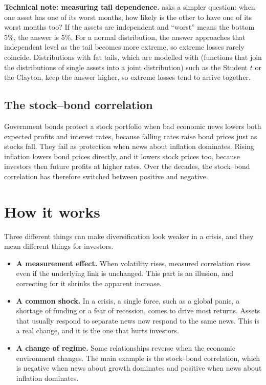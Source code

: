 \begin{technote}
\textbf{Technical note: measuring tail dependence.}  asks a simpler question: when one asset has one of its worst months, how likely is the other to have one of its worst months too? If the assets are independent and ``worst'' means the bottom 5\%, the answer is 5\%. For a normal distribution, the answer approaches that independent level as the tail becomes more extreme, so extreme losses rarely coincide. Distributions with fat tails, which are modelled with  (functions that join the distributions of single assets into a joint distribution) such as the Student $t$ or the Clayton, keep the answer higher, so extreme losses tend to arrive together.
\end{technote}

\subsection{The stock--bond correlation}

Government bonds protect a stock portfolio when bad economic news lowers both expected profits and interest rates, because falling rates raise bond prices just as stocks fall. They fail as protection when news about inflation dominates. Rising inflation lowers bond prices directly, and it lowers stock prices too, because investors then  future profits at higher rates. Over the decades, the stock--bond correlation has therefore switched between positive and negative.


\section{How it works}
\label{sec:13-how}

Three different things can make diversification look weaker in a crisis, and they mean different things for investors.

\begin{itemize}
  \item \textbf{A measurement effect.} When volatility rises, measured correlation rises even if the underlying link is unchanged. This part is an illusion, and correcting for it shrinks the apparent increase.
  \item \textbf{A common shock.} In a crisis, a single force, such as a global panic, a shortage of funding or a fear of recession, comes to drive most returns. Assets that usually respond to separate news now respond to the same news. This is a real change, and it is the one that hurts investors.
  \item \textbf{A change of regime.} Some relationships reverse when the economic environment changes. The main example is the stock--bond correlation, which is negative when news about growth dominates and positive when news about inflation dominates.
\end{itemize}

